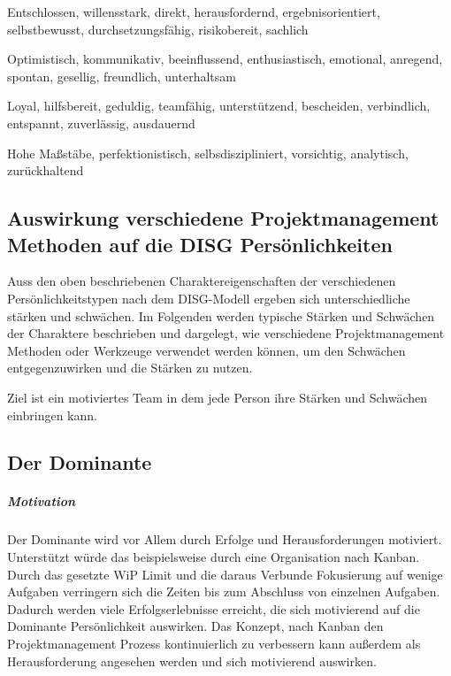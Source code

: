 \documentclass[twocolumn,10pt]{asme2ej}
\begin{document}
\begin{description}[align=left]
	\item [Dominant] Entschlossen, willensstark, direkt, herausfordernd, ergebnisorientiert, selbstbewusst, durchsetzungsfähig, risikobereit, sachlich
	\item [Initiativ] Optimistisch, kommunikativ, beeinflussend, enthusiastisch, emotional, anregend, spontan, gesellig, freundlich, unterhaltsam
	\item [Stetig] Loyal, hilfsbereit, geduldig, teamfähig, unterstützend, bescheiden, verbindlich, entspannt, zuverlässig, ausdauernd
	\item [Gewissenhaft] Hohe Maßstäbe, perfektionistisch, selbsdiszipliniert, vorsichtig, analytisch, zurückhaltend
	 \cite{disg_charakteristika}
\end{description}

%

\subsection{Auswirkung verschiedene Projektmanagement Methoden auf die DISG Persönlichkeiten}
Auss den oben beschriebenen Charaktereigenschaften der verschiedenen Persönlichkeitstypen nach dem DISG-Modell ergeben sich unterschiedliche stärken und schwächen. Im Folgenden werden typische Stärken und Schwächen der Charaktere beschrieben und dargelegt, wie verschiedene Projektmanagement Methoden oder Werkzeuge verwendet werden können, um den Schwächen entgegenzuwirken und die Stärken zu nutzen.

Ziel ist ein motiviertes Team in dem jede Person ihre Stärken und Schwächen einbringen kann.

\subsection{Der Dominante}
\subparagraph{Motivation}
Der Dominante  wird vor Allem durch Erfolge und Herausforderungen motiviert. Unterstützt würde das beispielsweise durch eine Organisation nach Kanban. Durch das gesetzte WiP Limit und die daraus Verbunde Fokusierung auf wenige Aufgaben verringern sich die Zeiten bis zum Abschluss von einzelnen Aufgaben. Dadurch werden viele Erfolgserlebnisse erreicht, die sich motivierend auf die Dominante Persönlichkeit auswirken. Das Konzept, nach Kanban den Projektmanagement Prozess kontinuierlich zu verbessern kann außerdem als Herausforderung angesehen werden und sich motivierend auswirken.
\end{document}

